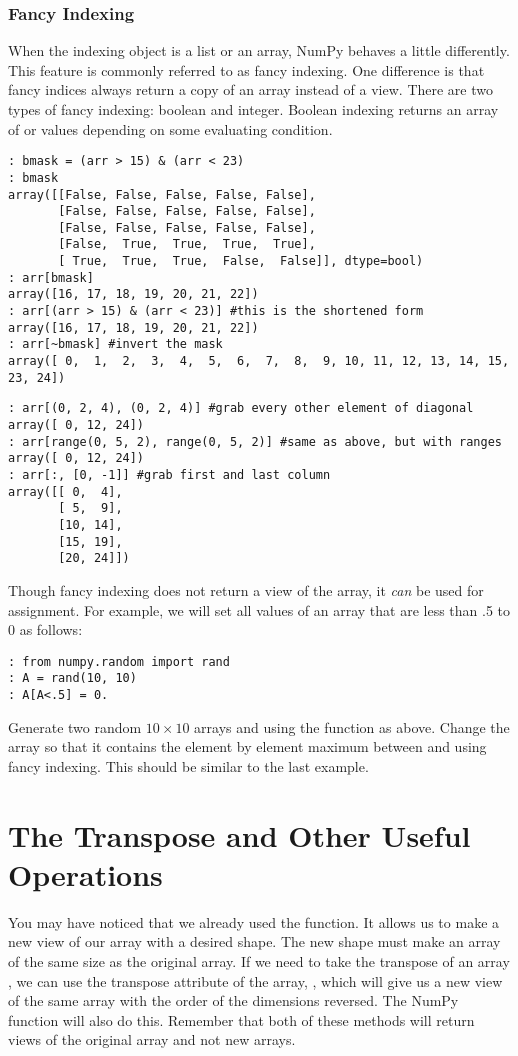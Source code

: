 \subsubsection*{Fancy Indexing}
When the indexing object is a list or an array, NumPy behaves a little differently.
This feature is commonly referred to as fancy indexing.
One difference is that fancy indices always return a copy of an array instead of a view.
There are two types of fancy indexing: boolean and integer.
Boolean indexing returns an array of  or  values depending on some evaluating condition.
\begin{lstlisting}
: bmask = (arr > 15) & (arr < 23)
: bmask
array([[False, False, False, False, False],
       [False, False, False, False, False],
       [False, False, False, False, False],
       [False,  True,  True,  True,  True],
       [ True,  True,  True,  False,  False]], dtype=bool)
: arr[bmask]
array([16, 17, 18, 19, 20, 21, 22])
: arr[(arr > 15) & (arr < 23)] #this is the shortened form
array([16, 17, 18, 19, 20, 21, 22])
: arr[~bmask] #invert the mask
array([ 0,  1,  2,  3,  4,  5,  6,  7,  8,  9, 10, 11, 12, 13, 14, 15, 23, 24])
\end{lstlisting}
\begin{lstlisting}
: arr[(0, 2, 4), (0, 2, 4)] #grab every other element of diagonal
array([ 0, 12, 24])
: arr[range(0, 5, 2), range(0, 5, 2)] #same as above, but with ranges
array([ 0, 12, 24])
: arr[:, [0, -1]] #grab first and last column
array([[ 0,  4],
       [ 5,  9],
       [10, 14],
       [15, 19],
       [20, 24]])
\end{lstlisting}

Though fancy indexing does not return a view of the array, it \emph{can} be used for assignment.
For example, we will set all values of an array that are less than .5 to 0 as follows:
\begin{lstlisting}
: from numpy.random import rand
: A = rand(10, 10)
: A[A<.5] = 0.
\end{lstlisting}

\begin{problem}
Generate two random $10 \times 10$ arrays  and  using the  function as above.
Change the array  so that it contains the element by element maximum between  and  using fancy indexing.
This should be similar to the last example.
\end{problem}

\section*{The Transpose and Other Useful Operations}
You may have noticed that we already used the  function.
It allows us to make a new view of our array with a desired shape.
The new shape must make an array of the same size as the original array.
If we need to take the transpose of an array , we can use the transpose attribute of the array, , which will give us a new view of the same array with the order of the dimensions reversed.
The NumPy  function will also do this.
Remember that both of these methods will return views of the original array and not new arrays.

